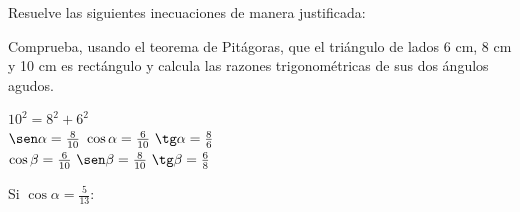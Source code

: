 \documentclass[addpoints,spanish, 12pt,a4paper]{exam}
\begin{document}
\begin{questions}

\question Resuelve las siguientes inecuaciones de manera justificada:
\begin{parts}

\part[1]$ x^{3}  + x <  2 x^{2} $
\begin{solution} $\left(-\infty, 0\right)$ \end{solution}


\part[2]$\dfrac{x - 1}{x^{2} + x}\geqslant 0$  
\begin{solution} $\left(-1, 0\right) \cup \left[1, \infty\right)$ \end{solution}


\end{parts}

\addpoints

\question[1] Comprueba, usando el teorema de Pitágoras, que el triángulo de lados 6 cm, 8 cm y 10 cm es rectángulo y calcula las razones trigonométricas de sus dos ángulos agudos.

\begin{solution}
$10^2= 8^2+6^2$ \\
$\sen \alpha = \frac{8}{10} \ \cos \alpha = \frac{6}{10} \ \tg \alpha = \frac{8}{6}$\\
$\cos \beta = \frac{6}{10} \ \sen \beta = \frac{8}{10} \ \tg \beta = \frac{6}{8}$
\end{solution}


\question Si $\cos \alpha = \frac{5}{13}$:
\end{questions}
\end{document}
